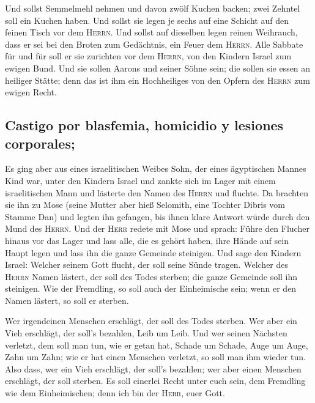  Und sollst Semmelmehl nehmen und davon zwölf Kuchen
backen; zwei Zehntel soll ein Kuchen haben.  Und sollst
sie legen je sechs auf eine Schicht auf den feinen Tisch vor dem
\textsc{Herrn}.  Und sollst auf dieselben legen reinen
Weihrauch, dass er sei bei den Broten zum Gedächtnis, ein Feuer dem
\textsc{Herrn}.  Alle Sabbate für und für soll er sie
zurichten vor dem \textsc{Herrn}, von den Kindern Israel zum ewigen
Bund.  Und sie sollen Aarons und seiner Söhne sein; die
sollen sie essen an heiliger Stätte; denn das ist ihm ein Hochheiliges
von den Opfern des \textsc{Herrn} zum ewigen Recht.

\hypertarget{castigo-por-blasfemia-homicidio-y-lesiones-corporales}{%
\subsection{Castigo por blasfemia, homicidio y lesiones
corporales;}\label{castigo-por-blasfemia-homicidio-y-lesiones-corporales}}

 Es ging aber aus eines israelitischen Weibes Sohn, der
eines ägyptischen Mannes Kind war, unter den Kindern Israel und zankte
sich im Lager mit einem israelitischen Mann  und lästerte
den Namen des \textsc{Herrn} und fluchte. Da brachten sie ihn zu Mose
(seine Mutter aber hieß Selomith, eine Tochter Dibris vom Stamme Dan)
 und legten ihn gefangen, bis ihnen klare Antwort würde
durch den Mund des \textsc{Herrn}.  Und der \textsc{Herr}
redete mit Mose und sprach:  Führe den Flucher hinaus vor
das Lager und lass alle, die es gehört haben, ihre Hände auf sein Haupt
legen und lass ihn die ganze Gemeinde steinigen.  Und
sage den Kindern Israel: Welcher seinem Gott flucht, der soll seine
Sünde tragen.  Welcher des \textsc{Herrn} Namen lästert,
der soll des Todes sterben; die ganze Gemeinde soll ihn steinigen. Wie
der Fremdling, so soll auch der Einheimische sein; wenn er den Namen
lästert, so soll er sterben.

 Wer irgendeinen Menschen erschlägt, der soll des Todes
sterben.  Wer aber ein Vieh erschlägt, der soll's
bezahlen, Leib um Leib.  Und wer seinen Nächsten
verletzt, dem soll man tun, wie er getan hat,  Schade um
Schade, Auge um Auge, Zahn um Zahn; wie er hat einen Menschen verletzt,
so soll man ihm wieder tun.  Also dass, wer ein Vieh
erschlägt, der soll's bezahlen; wer aber einen Menschen erschlägt, der
soll sterben.  Es soll einerlei Recht unter euch sein,
dem Fremdling wie dem Einheimischen; denn ich bin der \textsc{Herr},
euer Gott.

